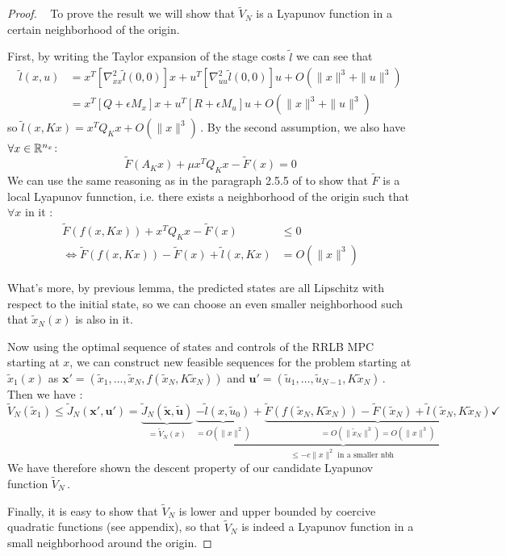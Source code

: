 \documentclass[12pt]{article}
\begin{document}
\begin{proof}~
	To prove the result we will show that $\tilde{V}_N$ is a Lyapunov function in a certain neighborhood of the origin.

	First, by writing the Taylor expansion of the stage costs $\tilde{l}$ we can see that
	\begin{align*}
		\tilde{l}(x,u)&=x^T[\nabla_{xx}^2\tilde{l}(0,0)] x+u^T[\nabla_{uu}^2\tilde{l}(0,0)]u+O(\|x\|^3+\|u\|^3)\\
		&=x^T[Q+\epsilon M_x]x+u^T[R+\epsilon M_u]u+O(\|x\|^3+\|u\|^3)
	\end{align*}
	so $\tilde{l}(x,Kx)=x^TQ_Kx+O(\|x\|^3)$\,.
	By the second assumption, we also have $\forall x\in\mathbb{R}^{n_x}$:
	$$\tilde{F}(A_Kx)+\mu x^T Q_K x-\tilde{F}(x)=0$$
	We can use the same reasoning as in the paragraph 2.5.5 of \cite[MPC Theory, Computation and Design]{MPC-book} to show that $\tilde{F}$ is a local Lyapunov funnction, i.e. there exists a neighborhood of the origin such that $\forall x$ in it :
	\begin{align*}
		\tilde{F}(f(x,Kx))+x^T Q_K x-\tilde{F}(x)&\leq 0\\
		\Longleftrightarrow\tilde{F}(f(x,Kx))-\tilde{F}(x)+\tilde{l}(x,Kx)&= O(\|x\|^3)
	\end{align*}

	What's more, by previous lemma, the predicted states are all Lipschitz with respect to the initial state, so we can choose an even smaller neighborhood such that $\tilde{x}_N(x)$ is also in it.
	
	Now using the optimal sequence of states and controls of the RRLB MPC starting at $x$, we can construct new feasible sequences for the problem starting at $\tilde{x}_1(x)$ as \newline
	$\mathbf{x}'=(\tilde{x}_1,\dots,\tilde{x}_N,f(\tilde{x}_N,K\tilde{x}_N))$ and $\mathbf{u}'=(\tilde{u}_1,\dots,\tilde{u}_{N-1},K\tilde{x}_N)$\,.
	Then we have :
	$$\tilde{V}_N(\tilde{x}_1)\leq\tilde{J}_N(\mathbf{x}',\mathbf{u}')=\underbrace{\tilde{J}_N(\tilde{\mathbf{x}},\tilde{\mathbf{u}})}_{=\tilde{V}_N(x)}~\underbrace{\underbrace{-\tilde{l}(x,\tilde{u}_0)}_{=O(\|x\|^2)}+\underbrace{\tilde{F}(f(\tilde{x}_N,K\tilde{x}_N))-\tilde{F}(\tilde{x}_N)+\tilde{l}(\tilde{x}_N,K\tilde{x}_N) }_{=O(\|\tilde{x}_N\|^3)=O(\|x\|^3)} }_{\leq-c\|x\|^2\text{ in a smaller nbh }}\checkmark$$
	We have therefore shown the descent property of our candidate Lyapunov function $\tilde{V}_N$\,.

	Finally, it is easy to show that $\tilde{V}_N$ is lower and upper bounded by coercive quadratic functions (see appendix), so that $\tilde{V}_N$ is indeed a Lyapunov function in a small neighborhood around the origin.
\end{proof}
\end{document}
